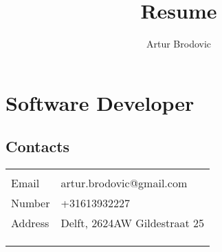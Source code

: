 \documentclass{article}
\begin{document}
\title{Resume}
\author{Artur Brodovic}
\maketitle

\section{Software Developer}
\subsection{Contacts}
\renewcommand{\arraystretch}{1.3}
\vspace{0.5em}
\begin{tabular}{l l}
    \hline \\[-1.0em]
    Email & artur.brodovic@gmail.com \\
    Number & +31613932227 \\
    Address & Delft, 2624AW Gildestraat 25 
\vspace{0.3em} \\
     & \raisebox{0.4em}{\url{https://github.com/magisterbrown}}\\
     & \raisebox{0.4em}{\url{https://www.linkedin.com/in/artur-brodovic}}\\

    \\[-1.0em] \hline 
\end{tabular}
\end{document}
